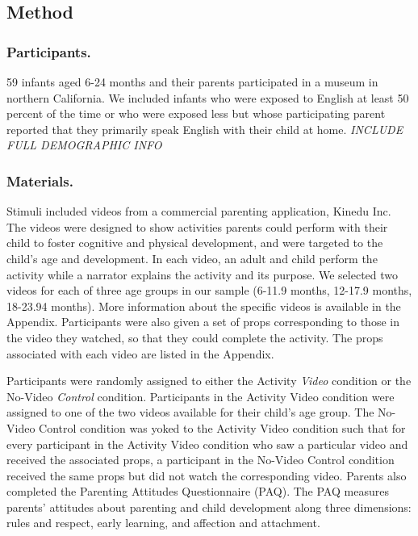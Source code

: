 \documentclass[10pt, letterpaper]{article}
\begin{document}
\subsection{Method}\label{method}

\subsubsection{Participants.}\label{participants.}

59 infants aged 6-24 months and their parents participated in a museum
in northern California. We included infants who were exposed to English
at least 50 percent of the time or who were exposed less but whose
participating parent reported that they primarily speak English with
their child at home. \emph{INCLUDE FULL DEMOGRAPHIC INFO}

\subsubsection{Materials.}\label{materials.}

Stimuli included videos from a commercial parenting application, Kinedu
Inc. The videos were designed to show activities parents could perform
with their child to foster cognitive and physical development, and were
targeted to the child's age and development. In each video, an adult and
child perform the activity while a narrator explains the activity and
its purpose. We selected two videos for each of three age groups in our
sample (6-11.9 months, 12-17.9 months, 18-23.94 months). More
information about the specific videos is available in the Appendix.
Participants were also given a set of props corresponding to those in
the video they watched, so that they could complete the activity. The
props associated with each video are listed in the Appendix.

Participants were randomly assigned to either the Activity \emph{Video}
condition or the No-Video \emph{Control} condition. Participants in the
Activity Video condition were assigned to one of the two videos
available for their child's age group. The No-Video Control condition
was yoked to the Activity Video condition such that for every
participant in the Activity Video condition who saw a particular video
and received the associated props, a participant in the No-Video Control
condition received the same props but did not watch the corresponding
video. Parents also completed the Parenting Attitudes Questionnaire
(PAQ). The PAQ measures parents' attitudes about parenting and child
development along three dimensions: rules and respect, early learning,
and affection and attachment.
\end{document}
